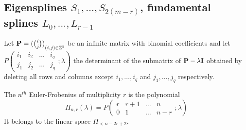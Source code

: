 \subsection{Eigensplines \texorpdfstring{$S_1, \ldots, S_{2(m-r)}$}{Lg}, fundamental splines \texorpdfstring{$L_0, 
\ldots, L_{r-1}$}{Lg}}

Let $\mathbf{P} = {(\binom{i}{j})}_{(i,j) \in \mathbb{Z}^2}$ be an infinite matrix with binomial coefficients and let 
$P\left(\begin{matrix} i_1 & i_2 & \hdots & i_q \\ j_1 & j_2 & \hdots & j_q \end{matrix}; \lambda \right)$ the 
determinant of the submatrix of $\mathbf{P}-\lambda\mathbf{I}$ obtained by deleting all rows and columns except $i_1, 
\ldots, i_q$ and $j_1, \ldots, j_q$ respectively.

\begin{deftn}\label{def:EF-r}
  The $n^{th}$ Euler-Frobenius of multiplicity $r$ is the polynomial
  \begin{equation}\label{eq:def-EF-r}
    \Pi_{n,r}(\lambda) = P\left(\begin{matrix} r & r+1 & \hdots & n \\ 0 & 1 & \hdots & n-r \end{matrix}; \lambda 
    \right)
    \end{equation}
    It belongs to the linear space $\Pi_{<n-2r+2}$.
\end{deftn}

